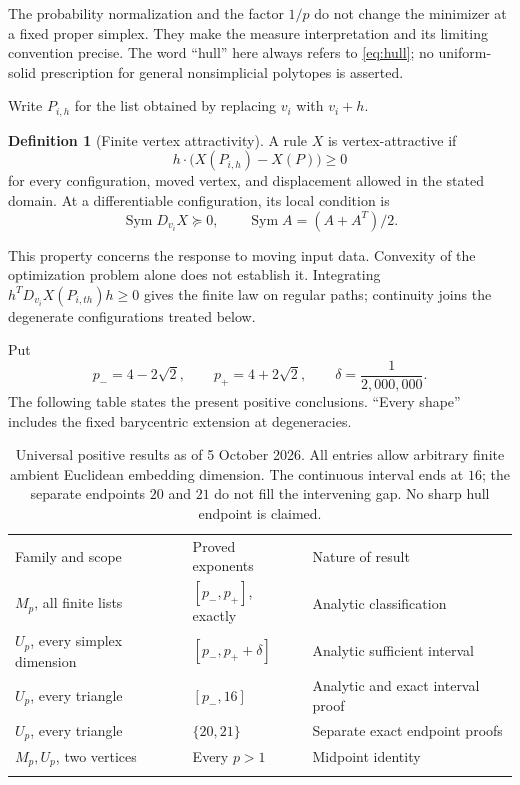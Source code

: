 \documentclass[11pt]{article}
\theoremstyle{definition}
\newtheorem{definition}[theorem]{Definition}
\newcommand{\Sym}{\operatorname{Sym}}
\newcommand{\pn}{p_{-}}
\newcommand{\pp}{p_{+}}
\newcommand{\toprule}{\noalign{\hrule height 0.8pt\vskip4pt}}
\newcommand{\midrule}{\noalign{\vskip3pt\hrule height 0.4pt\vskip3pt}}
\newcommand{\bottomrule}{\noalign{\vskip3pt\hrule height 0.8pt}}
\begin{document}
The probability normalization and the factor $1/p$ do not change the
minimizer at a fixed proper simplex. They make the measure interpretation
and its limiting convention precise. The word ``hull'' here always refers
to \eqref{eq:hull}; no uniform-solid prescription for general nonsimplicial
polytopes is asserted.

Write $P_{i,h}$ for the list obtained by replacing $v_i$ with $v_i+h$.
\begin{definition}[Finite vertex attractivity]
A rule $X$ is vertex-attractive if
\begin{equation}\label{eq:finite}
 h\cdot\bigl(X(P_{i,h})-X(P)\bigr)\ge0
\end{equation}
for every configuration, moved vertex, and displacement allowed in the
stated domain. At a differentiable configuration, its local condition is
\begin{equation}\label{eq:local}
 \Sym D_{v_i}X\succeq0,\qquad \Sym A=(A+A^T)/2.
\end{equation}
\end{definition}
This property concerns the response to moving input data. Convexity of the
optimization problem alone does not establish it. Integrating
$h^TD_{v_i}X(P_{i,th})h\ge0$ gives the finite law on regular paths;
continuity joins the degenerate configurations treated below.

Put
\[
 \pn=4-2\sqrt2,\qquad \pp=4+2\sqrt2,\qquad
 \delta=\frac1{2{,}000{,}000}.
\]
The following table states the present positive conclusions. ``Every shape''
includes the fixed barycentric extension at degeneracies.
\begin{table}[htbp]
\centering
\begin{tabularx}{\linewidth}{@{}lXl@{}}
\toprule
Family and scope & Proved exponents & Nature of result\\
\midrule
$M_p$, all finite lists & $[\pn,\pp]$, exactly & Analytic classification\\
$U_p$, every simplex dimension & $[\pn,\pp+\delta]$ & Analytic sufficient interval\\
$U_p$, every triangle & $[\pn,16]$ & Analytic and exact interval proof\\
$U_p$, every triangle & $\{20,21\}$ & Separate exact endpoint proofs\\
$M_p,U_p$, two vertices & Every $p>1$ & Midpoint identity\\
\bottomrule
\end{tabularx}
\caption{Universal positive results as of 5 October 2026. All entries allow
arbitrary finite ambient Euclidean embedding dimension. The continuous
interval ends at $16$; the separate endpoints $20$ and $21$ do not fill
the intervening gap. No sharp hull endpoint is claimed.}
\label{tab:positive}
\end{table}
\end{document}
